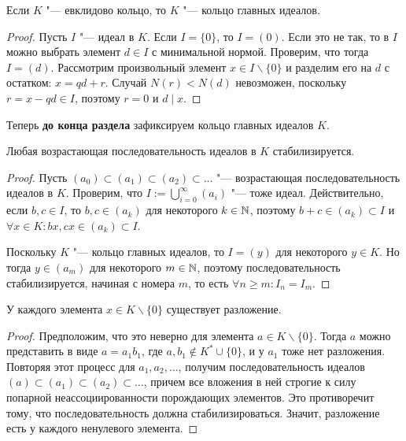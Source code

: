 \begin{theorem}
	Если $K$ "--- евклидово кольцо, то $K$ "--- кольцо главных идеалов.
\end{theorem}

\begin{proof}
	Пусть $I$ "--- идеал в $K$. Если $I = \{0\}$, то $I = (0)$. Если это не так, то в $I$ можно выбрать элемент $d \in I$ с минимальной нормой. Проверим, что тогда $I = (d)$. Рассмотрим произвольный элемент $x \in I \backslash \{0\}$ и разделим его на $d$ с остатком: $x = qd + r$. Случай $N(r) < N(d)$ невозможен, поскольку $r = x - qd \in I$, поэтому $r = 0$ и $d \mid x$.
\end{proof}

Теперь \textbf{до конца раздела} зафиксируем кольцо главных идеалов $K$.

\begin{proposition}
	Любая возрастающая последовательность идеалов в $K$ стабилизируется.
\end{proposition}

\begin{proof}
	Пусть $(a_0) \subset (a_1) \subset (a_2) \subset \dotsc$ "--- возрастающая последовательность идеалов в $K$. Проверим, что $I := \bigcup_{i = 0}^\infty (a_i)$ "--- тоже идеал. Действительно, если $b, c \in I$, то $b, c \in (a_k)$ для некоторого $k \in \mathbb{N}$, поэтому $b + c \in (a_k) \subset I$ и $\forall x \in K: bx, cx \in (a_k) \subset I$.
	
	Поскольку $K$ "--- кольцо главных идеалов, то $I = (y)$ для некоторого $y \in K$. Но тогда $y \in (a_m)$ для некоторого $m \in \mathbb{N}$, поэтому последовательность стабилизируется, начиная с номера $m$, то есть $\forall n \ge m: I_n = I_m$.
\end{proof}

\begin{proposition}
	У каждого элемента $x \in K \backslash \{0\}$ существует разложение.
\end{proposition}

\begin{proof}
	Предположим, что это неверно для элемента $a \in K \backslash \{0\}$. Тогда $a$ можно представить в виде $a = a_1b_1$, где $a, b_1 \not\in K^* \cup \{0\}$, и у $a_1$ тоже нет разложения. \pagebreak Повторяя этот процесс для $a_1, a_2, \dotsc$, получим последовательность идеалов $(a) \subset (a_1) \subset (a_2) \subset \dots$, причем все вложения в ней строгие к силу попарной неассоциированности порождающих элементов. Это противоречит тому, что последовательность должна стабилизироваться. Значит, разложение есть у каждого ненулевого элемента.
\end{proof}


